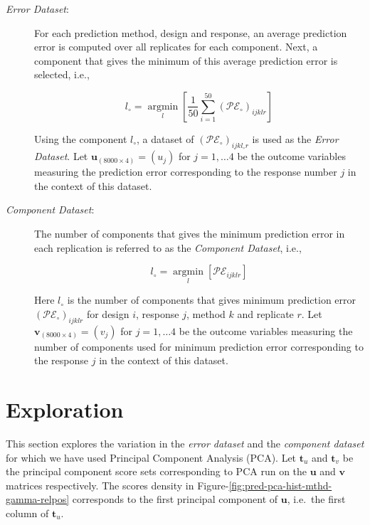\documentclass[review]{elsarticle}
\begin{document}
\begin{description}
\item[\emph{Error Dataset}:]
For each prediction method, design and response, an average prediction
error is computed over all replicates for each component. Next, a
component that gives the minimum of this average prediction error is
selected, i.e.,

\begin{equation}
  l_\circ = \operatorname*{argmin}_{l}\left[\frac{1}{50}\sum_{i=1}^{50}{\left(\mathcal{PE}_\circ\right)_{ijklr}}\right]
  \label{eq:min-pred}
  \end{equation}

Using the component \(l_\circ\), a dataset of
\(\left(\mathcal{PE}_\circ\right)_{ijkl_\circ r}\) is used as the
\emph{Error Dataset}. Let \(\mathbf{u}_{(8000 \times 4)} = (u_j)\) for
\(j = 1, \ldots 4\) be the outcome variables measuring the prediction
error corresponding to the response number \(j\) in the context of this
dataset.
\item[\emph{Component Dataset}:]
The number of components that gives the minimum prediction error in each
replication is referred to as the \emph{Component Dataset}, i.e.,

\begin{equation}
  l_{\circ} = \operatorname*{argmin}_{l}\left[\mathcal{PE}_{ijklr}\right]
  \label{eq:min-comp}
  \end{equation}

Here \(l_\circ\) is the number of components that gives minimum
prediction error \(\left(\mathcal{PE}_\circ\right)_{ijklr}\) for design
\(i\), response \(j\), method \(k\) and replicate \(r\). Let
\(\mathbf{v}_{(8000 \times 4)} = (v_j)\) for \(j = 1, \ldots 4\) be the
outcome variables measuring the number of components used for minimum
prediction error corresponding to the response \(j\) in the context of
this dataset.
\end{description}

\section{Exploration}\label{exploration}

This section explores the variation in the \emph{error dataset} and the
\emph{component dataset} for which we have used Principal Component
Analysis (PCA). Let \(\mathbf{t}_u\) and \(\mathbf{t}_v\) be the
principal component score sets corresponding to PCA run on the
\(\mathbf{u}\) and \(\mathbf{v}\) matrices respectively. The scores
density in Figure-\ref{fig:pred-pca-hist-mthd-gamma-relpos} corresponds
to the first principal component of \(\mathbf{u}\), i.e.~the first
column of \(\mathbf{t}_u\).
\end{document}

